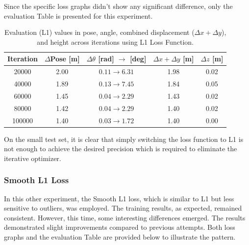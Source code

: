 Since the specific loss graphs didn’t show any significant difference, only the evaluation Table is presented for this experiment.
\begin{table}[H]
    \centering
    \scriptsize
    \renewcommand{\arraystretch}{1.2} 
    \setlength{\tabcolsep}{10pt} 
    \begin{tabular}{c c c c c}
        \toprule
        \textbf{Iteration} & \textbf{$\Delta$Pose [m]} & \textbf{$\Delta \theta$ [rad] $\rightarrow$ [deg]} & \textbf{$\Delta x + \Delta y$ [m]} & \textbf{$\Delta z$ [m]} \\
        \midrule
        \num{20000}  & 2.00 & $0.11 \rightarrow 6.31$  & 1.98 & 0.02 \\
        \num{40000}  & 1.89 & $0.13 \rightarrow 7.45$  & 1.84 & 0.05 \\
        \num{60000}  & 1.45 & $0.04 \rightarrow 2.29$  & 1.43 & 0.02 \\
        \num{80000}  & 1.42 & $0.04 \rightarrow 2.29$  & 1.40 & 0.02 \\
        \num{100000} & 1.40 & $0.03 \rightarrow 1.72$  & 1.40 & 0.00 \\
        \bottomrule
    \end{tabular}
    \caption{Evaluation (L1) values in pose, angle, combined displacement ($\Delta x + \Delta y$), and height across iterations using L1 Loss Function.}
    \label{tab:pose_variations_l1}
\end{table}
On the small test set, it is clear that simply switching the loss function to L1 is not enough to achieve the desired precision which is required to eliminate the iterative optimizer.

\subsubsection*{Smooth L1 Loss}
In this other experiment, the Smooth L1 loss, which is similar to L1 but less sensitive to outliers, was employed. The training results, as expected, remained consistent. However, this time, some interesting differences emerged. The results demonstrated slight improvements compared to previous attempts. Both loss graphs and the evaluation Table are provided below to illustrate the pattern.

